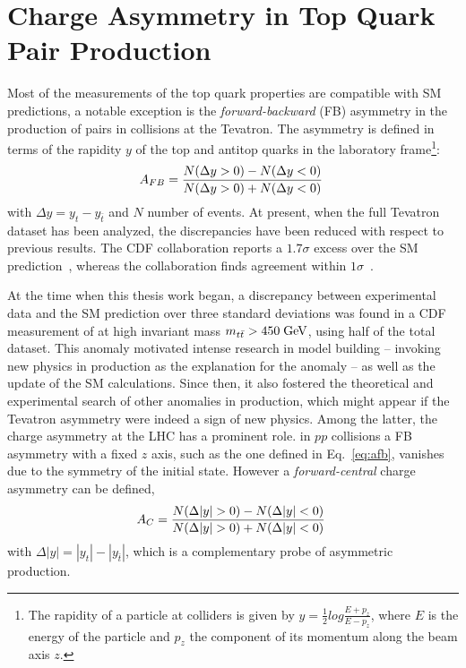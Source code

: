 \section{Charge Asymmetry in Top Quark Pair Production}
\label{sec:topca}

Most of the measurements of the top quark properties are compatible
with SM predictions, a notable exception is the {\it forward-backward}
(FB) asymmetry in the production of \ttbar{} pairs in \ppbar{}
collisions at the Tevatron. 
The asymmetry \afb{} is defined in terms of the rapidity $y$ of the top and
antitop quarks in the laboratory frame\footnote{The rapidity of a
  particle at colliders is given by $y=\frac{1}{2}log\frac{E+p_z}{E-p_z}$, where
  $E$ is the energy of the particle and $p_z$ the component of its
  momentum along the beam axis $z$.}: 
\begin{equation}
\label{eq:afb}
\mbox{$A_{FB}$}{}=\frac{N(\Delta{}y>0)-N(\Delta{}y<0)}{N(\Delta{}y>0)+N(\Delta{}y<0)}
\phantom{,}
\end{equation}
with $\Delta{}y=y_t - y_{\bar{t}}$ and $N$ number of events.
At present, when the full Tevatron dataset has been analyzed, the
discrepancies have been reduced with respect to previous results. The
CDF collaboration reports a $1.7\sigma$ excess over the SM
prediction~\cite{Aaltonen:2012it}, whereas the \dzero{} collaboration
finds agreement within $1\sigma$~\cite{Abazov:2014cca}.

At the time when this thesis work began, a discrepancy between
experimental data and the SM prediction over three standard deviations
was found in a CDF measurement of \afb{} at high \ttbar{} invariant
mass $\mbox{$m_{t\bar{t}}$}{}>450\; \mathrm{GeV}{}$, using half of the total dataset. This anomaly
motivated intense research in model building -- invoking new physics
in \ttbar{} production as the explanation for the anomaly -- as well
as the update of the SM calculations. Since then, it also fostered the
theoretical and experimental search of other anomalies in \ttbar{}
production, which might appear if the Tevatron asymmetry were indeed a
sign of new physics. Among the latter, the charge asymmetry at the LHC
has a prominent role. in $pp$ collisions a FB asymmetry with a fixed
$z$ axis, such as the one defined in Eq.~\ref{eq:afb}, vanishes due to
the symmetry of the initial state. However a {\it forward-central} charge
asymmetry \ac{} can be defined, 
\begin{equation}
\label{eq:ac}
\ac{}=\frac{N(\Delta{}|y|>0)-N(\Delta{}|y|<0)}{N(\Delta{}|y|>0)+N(\Delta{}|y|<0)}
\phantom{,}
\end{equation}
with $\Delta{}|y|=|y_t| - |y_{\bar{t}}|$, which is a complementary
probe of asymmetric \ttbar{} production.


